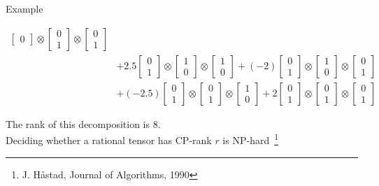 \documentclass{beamer}
\begin{document}
\begin{frame}{Example}
\begin{footnotesize}
\begin{equation*}
\begin{aligned}
\begin{bmatrix}
0
\end{bmatrix}
\otimes
\begin{bmatrix}
0\\
1
\end{bmatrix}
\otimes
\begin{bmatrix}
0\\
1
\end{bmatrix}\\
%
%
%
&+
2.5
\begin{bmatrix}
0\\
1
\end{bmatrix}
\otimes
\begin{bmatrix}
1\\
0
\end{bmatrix}
\otimes
\begin{bmatrix}
1\\
0
\end{bmatrix}
+
(-2)
\begin{bmatrix}
0\\
1
\end{bmatrix}
\otimes
\begin{bmatrix}
1\\
0
\end{bmatrix}
\otimes
\begin{bmatrix}
0\\
1
\end{bmatrix}\\
%
%
%
&+
(-2.5)
\begin{bmatrix}
0\\
1
\end{bmatrix}
\otimes
\begin{bmatrix}
0\\
1
\end{bmatrix}
\otimes
\begin{bmatrix}
1\\
0
\end{bmatrix}
+
2
\begin{bmatrix}
0\\
1
\end{bmatrix}
\otimes
\begin{bmatrix}
0\\
1
\end{bmatrix}
\otimes
\begin{bmatrix}
0\\
1
\end{bmatrix}
\end{aligned}
\end{equation*}
\end{footnotesize}
\pause
The rank of this decomposition is 8.\\
\pause
Deciding whether a rational tensor has CP-rank $r$ is
NP-hard~\footnote{J. H\aa stad, Journal of Algorithms, 1990}

\end{frame}
\end{document}

